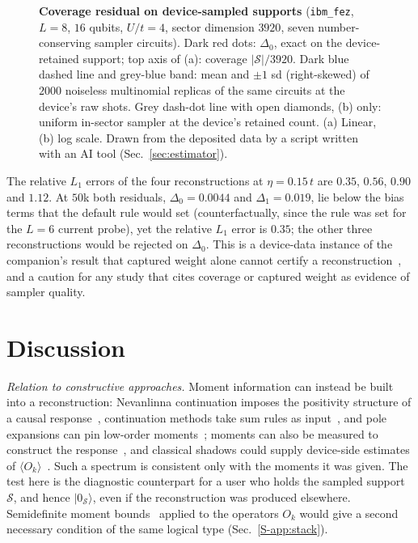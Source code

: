 \documentclass[aps,prb,reprint,onecolumn,12pt,superscriptaddress,longbibliography,floatfix]{revtex4-2}
\newcommand{\colfig}{\setlength{\columnwidth}{0.62\textwidth}}%
\newcommand{\colfig}{}
\begin{document}
\begin{figure}[t]
\centering\colfig
{}
\caption{\textbf{Coverage residual on device-sampled supports} (\texttt{ibm\_fez}, $L=8$, $16$ qubits, $U/t=4$, sector dimension $3920$, seven number-conserving sampler circuits). Dark red dots: $\Delta_0$, exact on the device-retained support; top axis of (a): coverage $|\mathcal S|/3920$. Dark blue dashed line and grey-blue band: mean and $\pm1$ sd (right-skewed) of $2000$ noiseless multinomial replicas of the same circuits at the device's raw shots. Grey dash-dot line with open diamonds, (b) only: uniform in-sector sampler at the device's retained count. (a) Linear, (b) log scale. Drawn from the deposited data by a script written with an AI tool (Sec.~\ref{sec:estimator}).}
\label{fig:device}
\end{figure}

The relative $L_1$ errors of the four reconstructions at $\eta=0.15\,t$ are $0.35$, $0.56$, $0.90$ and $1.12$. At $50$k both residuals, $\Delta_0=0.0044$ and $\Delta_1=0.019$, lie below the bias terms that the default rule would set (counterfactually, since the rule was set for the $L=6$ current probe), yet the relative $L_1$ error is $0.35$; the other three reconstructions would be rejected on $\Delta_0$. This is a device-data instance of the companion's result that captured weight alone cannot certify a reconstruction~\cite{SQDspec2608}, and a caution for any study that cites coverage or captured weight as evidence of sampler quality.

\section{Discussion}
\label{sec:limits}

\emph{Relation to constructive approaches.} Moment information can instead be built into a reconstruction: Nevanlinna continuation imposes the positivity structure of a causal response~\cite{Fei2021}, continuation methods take sum rules as input~\cite{Jarrell1996,Sandvik1998}, and pole expansions can pin low-order moments~\cite{HuangLiang2023,ZhangGull2024}; moments can also be measured to construct the response~\cite{IrmejsSantos2025,GreeneDiniz2024}, and classical shadows could supply device-side estimates of $\langle O_k\rangle$~\cite{HuangKuengPreskill2020}. Such a spectrum is consistent only with the moments it was given. The test here is the diagnostic counterpart for a user who holds the sampled support $\mathcal S$, and hence $|0_\mathcal S\rangle$, even if the reconstruction was produced elsewhere. Semidefinite moment bounds~\cite{WangAcin2024,Mortimer2026} applied to the operators $O_k$ would give a second necessary condition of the same logical type (Sec.~\ref{S-app:stack}).
\end{document}
